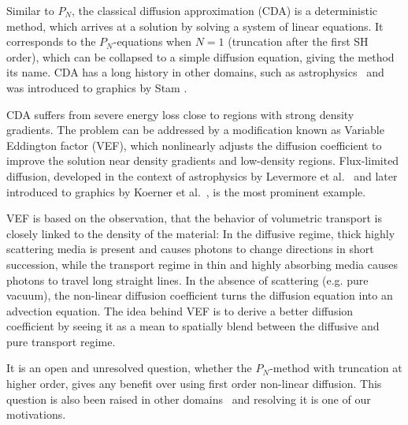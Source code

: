 Similar to $P_N$, the classical diffusion approximation (CDA) is a deterministic method, which arrives at a solution by solving a system of linear equations. It corresponds to the $P_N$-equations when $N=1$ (truncation after the first SH order), which can be collapsed to a simple diffusion equation, giving the method its name. CDA has a long history in other domains, such as astrophysics~\cite{Ishimaru78} and was introduced to graphics by Stam \cite{Stam95}.

CDA suffers from severe energy loss close to regions with strong density gradients. The problem can be addressed by a modification known as Variable Eddington factor (VEF), which nonlinearly adjusts the diffusion coefficient to improve the solution near density gradients and low-density regions. Flux-limited diffusion, developed in the context of astrophysics by Levermore et al.~\cite{Levermore81} and later introduced to graphics by Koerner et al.~\cite{Koerner14}, is the most prominent example.

VEF is based on the observation, that the behavior of volumetric transport is closely linked to the density of the material: In the diffusive regime, thick highly scattering media is present and causes photons to change directions in short succession, while the transport regime in thin and highly absorbing media causes photons to travel long straight lines. In the absence of scattering (e.g. pure vacuum), the non-linear diffusion coefficient turns the diffusion equation into an advection equation. The idea behind VEF is to derive a better diffusion coefficient by seeing it as a mean to spatially blend between the diffusive and pure transport regime.

It is an open and unresolved question, whether the $P_N$-method with truncation at higher order, gives any benefit over using first order non-linear diffusion. This question is also been raised in other domains~\cite{Olson00} and resolving it is one of our motivations.

\vspace{1in}




